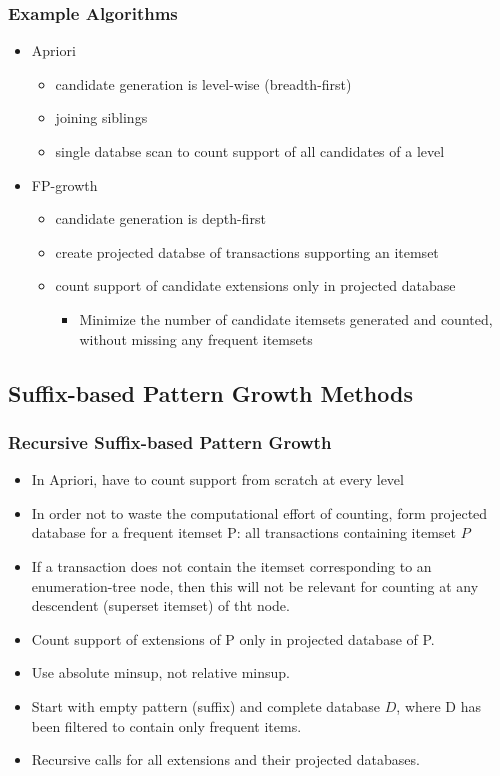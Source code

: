 \documentclass[../notes.tex]{subfiles}
\begin{document}
\subsubsection{Example Algorithms}
\begin{itemize}
  \item Apriori
    \begin{itemize}
    \item candidate generation is level-wise (breadth-first)
    \item joining siblings
    \item single databse scan to count support of all candidates of a level
    \end{itemize}
  \item FP-growth
    \begin{itemize}
    \item candidate generation is depth-first
    \item create projected databse of transactions supporting an itemset
    \item count support of candidate extensions only in projected database
      \begin{itemize}
        \item Minimize the number of candidate itemsets generated and counted, without missing any frequent itemsets
      \end{itemize}
    \end{itemize}
\end{itemize}

\subsection{Suffix-based Pattern Growth Methods}
\subsubsection{Recursive Suffix-based Pattern Growth}
\begin{itemize}
\item In Apriori, have to count support from scratch at every level
\item In order not to waste the computational effort of counting, form projected database for a frequent itemset P: all transactions containing itemset $P$
\item If a transaction does not contain the itemset corresponding to an enumeration-tree node, then this will not be relevant for counting at any descendent (superset itemset) of tht node.
\item Count support of extensions of P only in projected database of P.
\item Use absolute minsup, not relative minsup.
\item Start with empty pattern (suffix) and complete database $D$, where D has been filtered to contain only frequent items.
\item Recursive calls for all extensions and their projected databases.
\end{itemize}
\end{document}
